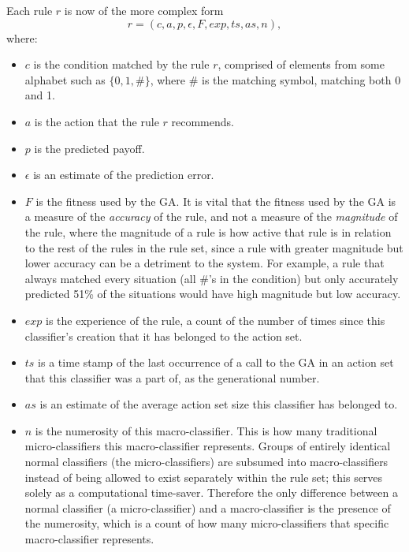 Each rule $r$ is now of the  more complex form
\begin{equation}
r = (c, a, p, \epsilon, F, exp, ts, as, n),
\end{equation}
where:
\begin{itemize}
\item
$c$ is the condition matched by the rule $r$, comprised of elements from some alphabet such as $\{0, 1, \#\}$,
where \# is the matching symbol, matching both 0 and 1.
\item
$a$ is the action that the rule $r$ recommends.
\item
$p$ is the predicted payoff.
\item
$\epsilon$ is an estimate of the prediction error.
\item
$F$ is the fitness used by the GA.
It is vital that the fitness used by the GA is a measure of the \emph{accuracy} of the rule,
and not a measure of the \emph{magnitude} of the rule, where the magnitude of a rule is how active that rule is in relation to the rest of the rules in the rule set, since a rule with greater magnitude but lower accuracy can be a detriment to the system.
For example, a rule that always matched every situation (all \#'s in the condition) but only accurately predicted 51\% of the situations would have high magnitude but low accuracy.
\item
$exp$ is the experience of the rule,
a count of the number of times since this classifier's creation that it has belonged to the action set.
\item
$ts$ is a time stamp of the last occurrence of a call to the GA in an action set that this classifier was a part of, as the generational number.
\item
$as$ is an estimate of the average action set size this classifier has belonged to.
\item
$n$ is the numerosity of this macro-classifier.
This is how many traditional micro-classifiers this macro-classifier represents.
Groups of entirely identical normal classifiers (the micro-classifiers) are subsumed into macro-classifiers instead of being allowed to exist separately within the rule set; this serves solely as a computational time-saver.
Therefore the only difference between a normal classifier (a micro-classifier) and a macro-classifier is the presence of the numerosity, which is a count of how many micro-classifiers that specific macro-classifier represents.
\end{itemize}
